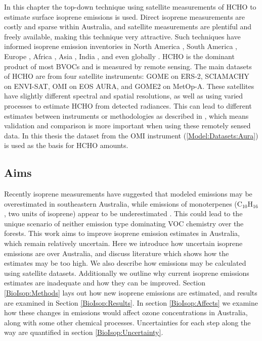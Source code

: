   In this chapter the top-down technique using satellite measurements of HCHO to estimate surface isoprene emissions is used.
  Direct isoprene measurements are costly and sparse within Australia, and satellite measurements are plentiful and freely available, making this technique very attractive.
  Such techniques have informed isoprene emission inventories in North America \parencite{Abbot2003,Palmer2003,Palmer2006,Millet2006,Millet2008}, South America \parencite{Barkley2013}, Europe \parencite{Dufour2009,Curci2010}, Africa \parencite{Marais2012}, Asia \parencite{Fu2007,Stavrakou2014}, India \parencite{Surl2018}, and even globally \parencite{Shim2005,FortemsCheiney2012,Bauwens2016}.
  HCHO is the dominant product of most BVOCs and is measured by remote sensing.
  The main datasets of HCHO are from four satellite instruments: GOME on ERS-2, SCIAMACHY on ENVI-SAT, OMI on EOS AURA, and GOME2 on MetOp-A.
  These satellites have slightly different spectral and spatial resolutions, as well as using varied processes to estimate HCHO from detected radiances.
  This can lead to different estimates between instruments or methodologies as described in \textcite{Lorente2017}, which means validation and comparison is more important when using these remotely sensed data.
  In this thesis the dataset from the OMI instrument (\ref{Model:Datasets:Aura}) is used as the basis for HCHO amounts.
  
  \subsection{Aims}
    
    Recently isoprene measurements have suggested that modeled emissions may be overestimated in southeastern Australia, while
    emissions of monoterpenes (C$_{10}$H$_{16}$, two units of isoprene) appear to be underestimated \parencite{Emmerson2016}. This could lead to the unique scenario of neither emission type dominating VOC chemistry over the forests.
    This work aims to improve isoprene emission estimates in Australia, which remain relatively uncertain.
    Here we introduce how uncertain isoprene emissions are over Australia, and discuss literature which shows how the estimates may be too high.
    We also describe how emissions may be calculated using satellite datasets.
    Additionally we outline why current isoprene emissions estimates are inadequate and how they can be improved.
    Section \ref{BioIsop:Methods} lays out how new isoprene emissions are estimated, and results are examined in Section \ref{BioIsop:Results}. 
    In section \ref{BioIsop:Affects} we examine how these changes in emissions would affect ozone concentrations in Australia, along with some other chemical processes.
    Uncertainties for each step along the way are quantified in section \ref{BioIsop:Uncertainty}.
  
